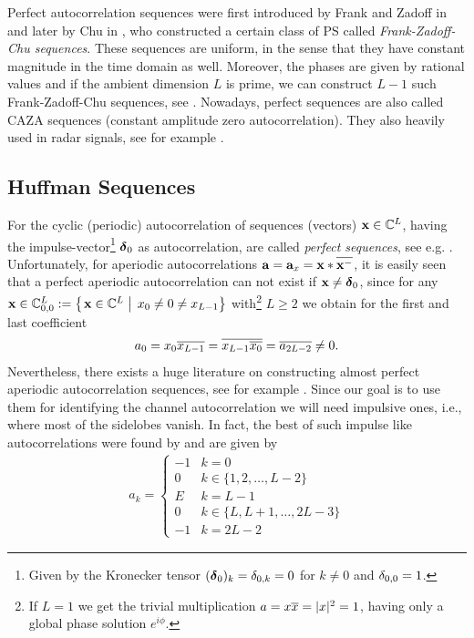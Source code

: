 \documentclass[conference]{IEEEtran}
\begin{document}
Perfect autocorrelation sequences were first introduced by Frank and
Zadoff in \cite{FZH62} and later by Chu in \cite{Chu72}, who
constructed a certain class of PS called
% 
\emph{Frank-Zadoff-Chu
  sequences}. These sequences are
uniform, in the sense that they have constant magnitude in the time
domain as well. Moreover, the phases are given by rational values and
if the ambient dimension $L$ is prime, we can construct $L-1$ such
Frank-Zadoff-Chu sequences, see \cite[5.8]{Lue92}.  Nowadays, perfect
sequences are also called CAZA sequences (constant amplitude zero
autocorrelation). They also heavily used in radar signals, see for
example \cite{LM04}.
%
\fi

\subsection{Huffman Sequences}
% 
For the cyclic (periodic) autocorrelation of sequences (vectors) ${\mathbf x}\in{\ensuremath{\mathbb C}}^{L}$, having the impulse-vector\footnote{
%
Given by the Kronecker tensor $(\boldsymbol \delta_0)_k=\delta_{0,k}=0$ for $k\not=0$ and $\delta_{0,0}=1$.}
%
$\boldsymbol \delta_0$ as autocorrelation, are  called \emph{perfect sequences}, see e.g. \cite[5.8]{Lue92}.
Unfortunately, for aperiodic autocorrelations ${\mathbf a}={\mathbf a}_x={\mathbf x}*{\overline{{\mathbf x}^-}}$, it is easily seen that a perfect aperiodic
autocorrelation can not exist if ${\mathbf x}\not=\boldsymbol \delta_0$, since for any
$\vx\in\C_{0,0}^L:=\set{\vx\in\C^L}{x_0\not=0\not=x_{L-1}}$ with\footnote{
%
If $L=1$ we get the trivial multiplication $a=x{\overline{x}}=|x|^2=1$, having only a global phase solution $e^{i\phi}$.}
%
$L\geq 2$ we obtain for the first and last coefficient
% 
\begin{align}
  a_{0}=x_0 {\overline{x_{L-1}}} = {\overline{x_{L-1}{\overline{x_0}}}}={\overline{a_{2L-2}}}\not=0.\label{eq:sidelobmin}
\end{align}
% 
Nevertheless, there exists a huge literature on constructing almost perfect aperiodic autocorrelation sequences, see for
example \cite[Cha.6]{Lue92}.  Since our goal is to use them for identifying the channel autocorrelation we will need
impulsive ones, i.e., where most of the sidelobes vanish. In fact, the best of such impulse like autocorrelations were
found by  \cite{Huf62} and are given by
%
\begin{align}
  a_k = \begin{cases}
    -1 & k=0\\ 
    0 & k\in \{1,2, \dots, L-2\}\\
    E & k=L-1\\
    0 & k\in \{L,L+1, \dots, 2L-3\}\\
    -1 & k=2L-2 
  \end{cases}\label{eq:huffmanautocor}
\end{align}
\end{document}

